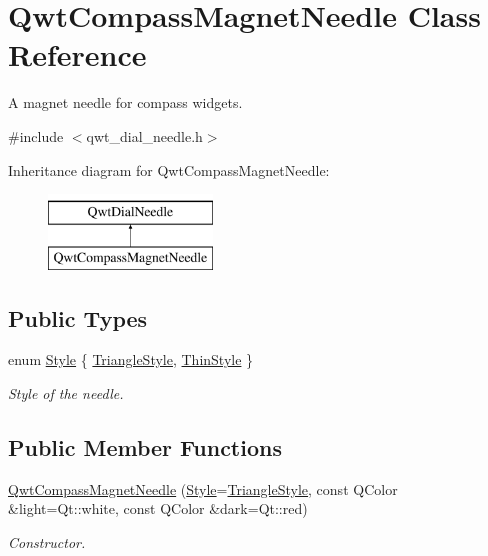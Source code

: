 \hypertarget{class_qwt_compass_magnet_needle}{\section{Qwt\-Compass\-Magnet\-Needle Class Reference}
\label{class_qwt_compass_magnet_needle}
}


A magnet needle for compass widgets.  




{\ttfamily \#include $<$qwt\-\_\-dial\-\_\-needle.\-h$>$}

Inheritance diagram for Qwt\-Compass\-Magnet\-Needle\-:\begin{figure}[H]
\begin{center}
\leavevmode
\includegraphics[height=2.000000cm]{class_qwt_compass_magnet_needle}
\end{center}
\end{figure}
\subsection*{Public Types}
\begin{DoxyCompactItemize}
\item 
enum \hyperlink{class_qwt_compass_magnet_needle_aee1d882c6ec8b680b94b59b5710a92a5}{Style} \{ \hyperlink{class_qwt_compass_magnet_needle_aee1d882c6ec8b680b94b59b5710a92a5ad2ba960c4dae88e36da39f6b62798f3b}{Triangle\-Style}, 
\hyperlink{class_qwt_compass_magnet_needle_aee1d882c6ec8b680b94b59b5710a92a5ab63a2dd26ef14c2aaf9763bc24a8bdac}{Thin\-Style}
 \}
\begin{DoxyCompactList}\small\item\em Style of the needle. \end{DoxyCompactList}\end{DoxyCompactItemize}
\subsection*{Public Member Functions}
\begin{DoxyCompactItemize}
\item 
\hyperlink{class_qwt_compass_magnet_needle_a3422e6490d44c527289bafdcceecd741}{Qwt\-Compass\-Magnet\-Needle} (\hyperlink{class_qwt_compass_magnet_needle_aee1d882c6ec8b680b94b59b5710a92a5}{Style}=\hyperlink{class_qwt_compass_magnet_needle_aee1d882c6ec8b680b94b59b5710a92a5ad2ba960c4dae88e36da39f6b62798f3b}{Triangle\-Style}, const Q\-Color \&light=Qt\-::white, const Q\-Color \&dark=Qt\-::red)
\begin{DoxyCompactList}\small\item\em Constructor. \end{DoxyCompactList}\end{DoxyCompactItemize}
